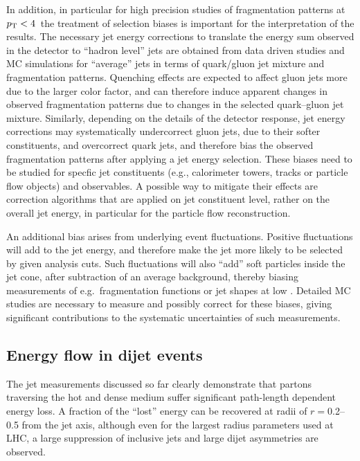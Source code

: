 In addition, in particular for high precision studies of fragmentation patterns at $\mbox{$p_{\mathrm{T}}$} < 4$\GeVc\,
the treatment of selection biases is important for the interpretation of the results. The necessary jet energy
corrections to translate the energy sum observed in the detector to ``hadron level'' jets are
obtained from data driven studies and MC simulations for ``average'' jets in terms of quark/gluon
jet mixture and fragmentation patterns. Quenching effects are expected to affect gluon jets more
due to the larger color factor, and can therefore induce apparent changes in observed fragmentation
patterns due to changes in the selected quark--gluon jet mixture. Similarly, depending on the
details of the detector response, jet energy corrections may systematically undercorrect gluon
jets, due to their softer constituents, and overcorrect quark jets, and therefore bias the
observed fragmentation patterns after applying a jet energy selection. These biases need to be
studied for specfic jet constituents (e.g., calorimeter towers, tracks or particle flow objects)
and observables. A possible way to mitigate their effects are correction algorithms that
are applied on jet constituent level, rather on the overall jet energy, in particular for
the particle flow reconstruction.

An additional bias arises from underlying event fluctuations. Positive fluctuations will add to the
jet energy, and therefore make the jet more likely to be selected by given analysis cuts. Such
fluctuations will also ``add'' soft particles inside the jet cone, after subtraction of an
average background, thereby biasing measurements of e.g.\ fragmentation functions or
jet shapes at low \pT. Detailed MC studies are necessary to measure and possibly correct
for these biases, giving significant contributions to the systematic uncertainties of
such measurements.


\subsection{Energy flow in dijet events}

The jet measurements discussed so far clearly demonstrate that partons traversing the hot and dense
medium suffer significant path-length dependent energy loss. A fraction of the ``lost'' energy
can be recovered at radii of $r=$0.2--0.5 from the jet axis, although even for the largest radius
parameters used at LHC, a large suppression of inclusive jets and large dijet asymmetries are
observed.

